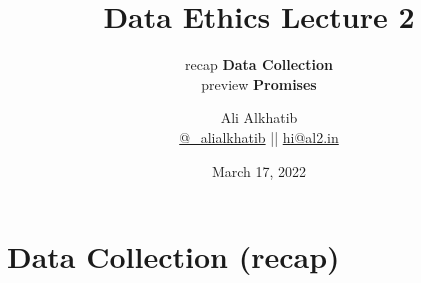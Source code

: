 \documentclass[aspectratio=169,17pt]{beamer} %
\title{Data Ethics Lecture 2}
\subtitle{recap {\bfseries Data Collection}\\preview {\bfseries Promises}}
\author[Ali Alkhatib]{{Ali Alkhatib}\\
\href{http://twitter.com/_alialkhatib}{@\_alialkhatib} || \href{mailto:hi@al2.in}{hi@al2.in}}
\date{March 17, 2022}
\newcommand{\onlyinsubfile}[1]{#1}
\newcommand{\notinsubfile}[1]{}
\begin{document}
\renewcommand{\onlyinsubfile}[1]{}
\renewcommand{\notinsubfile}[1]{#1}


\begin{frame}
\titlepage
\end{frame}





  

    
    


    






\section{Data Collection (recap)}
\end{document}
